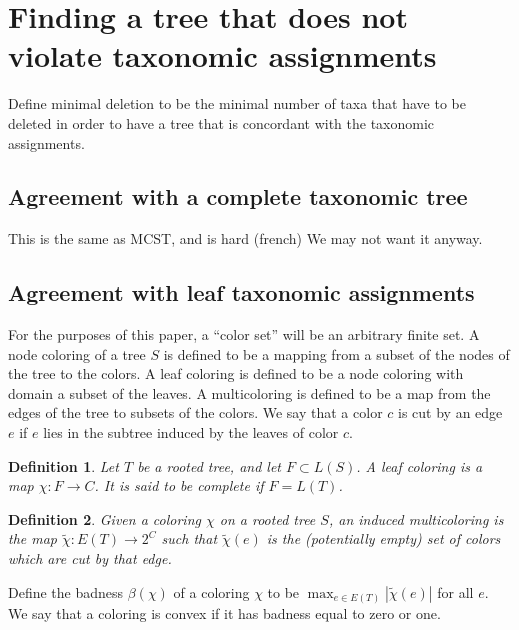 \documentclass{amsart}
\newcommand{\col}{\chi}
\newcommand{\colt}{\tilde{\chi}}
\newcommand{\bad}{\beta}
\newtheorem{defn}{Definition}
\begin{document}

\section{Finding a tree that does not violate taxonomic assignments}
Define minimal deletion to be the minimal number of taxa that have to be deleted in order to have a tree that is concordant with the taxonomic assignments.

\subsection{Agreement with a complete taxonomic tree}
This is the same as MCST, and is hard (french)
We may not want it anyway.

\subsection{Agreement with leaf taxonomic assignments}

For the purposes of this paper, a ``color set'' will be an arbitrary finite set.
A node coloring of a tree $S$ is defined to be a mapping from a subset of the nodes of the tree to the colors.
A leaf coloring is defined to be a node coloring with domain a subset of the leaves.
A multicoloring is defined to be a map from the edges of the tree to subsets of the colors.
We say that a color $c$ is cut by an edge $e$ if $e$ lies in the subtree induced by the leaves of color $c$.

\begin{defn}
  Let $T$ be a rooted tree, and let $F \subset L(S)$.
  A leaf coloring is a map $\col: F \rightarrow C$.
  It is said to be complete if $F = L(T)$.
\end{defn}

\begin{defn}
  Given a coloring $\col$ on a rooted tree $S$, an induced multicoloring is the map $\colt: E(T) \rightarrow 2^C$
  such that $\colt(e)$ is the (potentially empty) set of colors which are cut by that edge.
\end{defn}

Define the badness $\bad(\col)$ of a coloring $\col$ to be $\max_{e \in E(T)} |\colt(e)| $ for all $e$.
We say that a coloring is convex if it has badness equal to zero or one.
\end{document}
